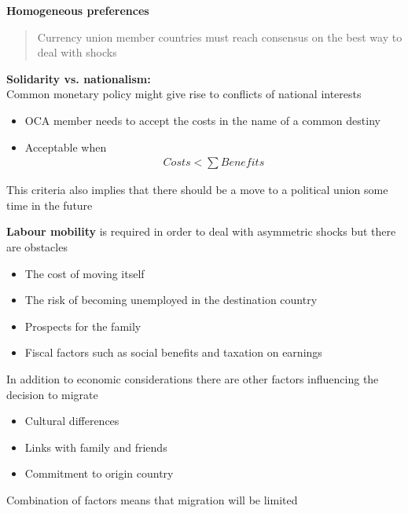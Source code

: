 \documentclass{beamer}
\begin{document}
\begin{frame}
  \textbf{Homogeneous preferences}
  \begin{quote}
    Currency union member countries must reach consensus on the best way to deal with shocks
  \end{quote}
    \medskip
  \textbf{Solidarity vs. nationalism:}\\
   Common monetary policy might give rise to conflicts of national interests
  \begin{itemize}
    \item OCA member needs to accept the costs in the name of a common destiny
    \item Acceptable when
    \begin{align*}
      Costs < \sum Benefits
    \end{align*}    
  \end{itemize}
  This criteria also implies that there should be a move to a political union some time in the future
\end{frame}

\begin{frame}

\end{frame}


\begin{frame}
  \textbf{Labour mobility} is required in order to deal with asymmetric shocks but there are obstacles
  \medskip
\begin{itemize}
  \item The cost of moving itself
  \item The risk of becoming unemployed in the destination country
  \item Prospects for the family
  \item Fiscal factors such as social benefits and taxation on earnings
\end{itemize}
\end{frame}

\begin{frame}
  In addition to economic considerations there are other factors influencing the decision to migrate
  \begin{itemize}
    \item Cultural differences
    \item Links with family and friends
    \item Commitment to origin country
  \end{itemize}
  \medskip
  Combination of factors means that migration will be limited
\end{frame}
\end{document}
